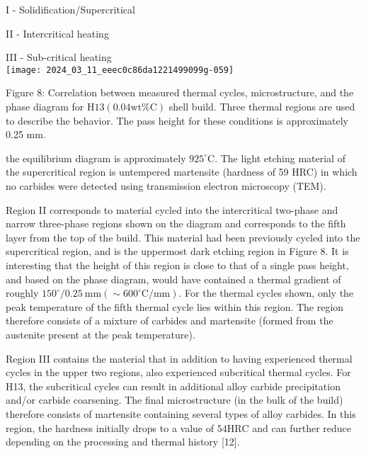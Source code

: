\documentclass[10pt]{article}
\begin{document}
I - Solidification/Supercritical

II - Intercritical heating

III - Sub-critical heating\\
\texttt{[image: 2024\_03\_11\_eeec0c86da1221499099g-059]}

Figure 8: Correlation between measured thermal cycles, microstructure, and the phase diagram for $\mathrm{H} 13(0.04 \mathrm{wt} \% \mathrm{C})$ shell build. Three thermal regions are used to describe the behavior. The pass height for these conditions is approximately 0.25 $\mathrm{mm}$.

the equilibrium diagram is approximately $925^{\circ} \mathrm{C}$. The light etching material of the supercritical region is untempered martensite (hardness of 59 HRC) in which no carbides were detected using transmission electron microscopy (TEM).

Region II corresponds to material cycled into the intercritical two-phase and narrow three-phase regions shown on the diagram and corresponds to the fifth layer from the top of the build. This material had been previously cycled into the supercritical region, and is the uppermost dark etching region in Figure 8. It is interesting that the height of this region is close to that of a single pass height, and based on the phase diagram, would have contained a thermal gradient of roughly $150^{\circ} / 0.25 \mathrm{~mm}\left(\sim 600^{\circ} \mathrm{C} / \mathrm{mm}\right)$. For the thermal cycles shown, only the peak temperature of the fifth thermal cycle lies within this region. The region therefore consists of a mixture of carbides and martensite (formed from the austenite present at the peak temperature).

Region III contains the material that in addition to having experienced thermal cycles in the upper two regions, also experienced subcritical thermal cycles. For H13, the subcritical cycles can result in additional alloy carbide precipitation and/or carbide coarsening. The final microstructure (in the bulk of the build) therefore consists of martensite containing several types of alloy carbides. In this region, the hardness initially drops to a value of $54 \mathrm{HRC}$ and can further reduce depending on the processing and thermal history [12].
\end{document}
